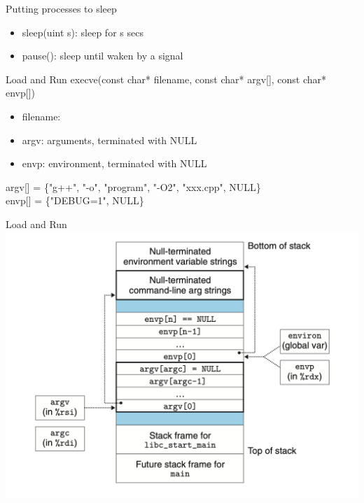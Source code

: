 \documentclass{beamer}
\begin{document}
    \begin{frame}{Putting processes to sleep}
        \begin{itemize}
            \item sleep(uint s): sleep for s secs
            \item pause(): sleep until waken by a signal
        \end{itemize}
    \end{frame}
    \begin{frame}{Load and Run}
        execve(const char* filename, const char* argv[], const char* envp[])
        \begin{itemize}
            \item filename:
            \item argv: arguments, terminated with NULL
            \item envp: environment, terminated with NULL
        \end{itemize}
        \begin{example}
            argv[] = \{"g++", "-o", "program", "-O2", "xxx.cpp", NULL\}\\
            envp[] = \{"DEBUG=1", NULL\}
        \end{example}
    \end{frame}
    \begin{frame}{Load and Run}
        \includegraphics[width=\textwidth]{execvememory.png}
    \end{frame}
    
\end{document}
